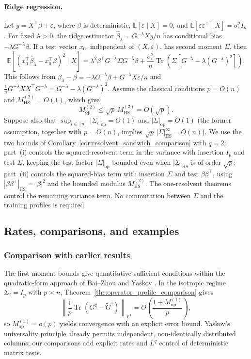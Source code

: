 \documentclass[EJP, preprint, NODS, nobera, nofontexpansion]{ejpecp}
\DeclareMathOperator{\op}{op}
\DeclareMathOperator{\tr}{Tr}
\DeclareMathOperator{\hs}{HS}
\begin{document}
\paragraph{Ridge regression.}
Let $y=X^\top\beta+\varepsilon$, where $\beta$ is deterministic,
$\mathbb E[\varepsilon\mid X]=0$, and
$\mathbb E[\varepsilon\varepsilon^\top\mid X]=\sigma_\varepsilon^2I_n$.
For fixed $\lambda>0$, the ridge estimator
$\hat\beta_{\lambda}=G^{-\lambda}Xy/n$ has conditional bias
$-\lambda G^{-\lambda}\beta$.  If a test vector $x_0$, independent of
$(X,\varepsilon)$, has second moment $\Sigma$, then
\[
\mathbb E\!\left[
    (x_0^\top\hat\beta_{\lambda}-x_0^\top\beta)^2\mid X
  \right]
    =
    \lambda^2\beta^\top G^{-\lambda}\Sigma G^{-\lambda}\beta
    +\frac{\sigma_\varepsilon^2}{n}
       \tr\!\left(\Sigma\left[G^{-\lambda}
                    -\lambda(G^{-\lambda})^2\right]\right).
\]
This follows from
$\hat\beta_{\lambda}-\beta=-\lambda G^{-\lambda}\beta
+G^{-\lambda}X\varepsilon/n$ and
$\frac1n G^{-\lambda}XX^\top G^{-\lambda}=G^{-\lambda}-\lambda(G^{-\lambda})^2$.
Assume the classical conditions $p=O(n)$ and $M_{\hs}^{(2)}=O(1)$, which give
\[
    M_{\op}^{(2)}
    \leq\sqrt p\,M_{\hs}^{(2)}
    =O(\sqrt p).
\]
Suppose also that $\sup_{i\in[n]}|\Sigma_i|_{\op}=O(1)$ and
$|\Sigma|_{\op}=O(1)$ (the former assumption, together with $p=O(n)$,
implies $\sqrt p\,|\Sigma|_{\hs}^{\infty}=O(n)$).
We use the two bounds of
Corollary~\ref{cor:resolvent_sandwich_comparison} with $q=2$:
part~\textnormal{(i)} controls the squared-resolvent term in the variance
with insertion $I_p$ and test $\Sigma$, keeping the test factor
$|\Sigma|_{\op}$ bounded even when $|\Sigma|_{\hs}$ is of order $\sqrt p$;
part~\textnormal{(ii)} controls the squared-bias term with insertion
$\Sigma$ and test $\beta\beta^\top$, using
$|\beta\beta^\top|_{\hs}=|\beta|^2$ and the bounded modulus
$M_{\hs}^{(2)}$.
The one-resolvent theorems control the remaining variance term.  No
commutation between $\Sigma$ and the training profiles is required.

\subsection{Rates, comparisons, and examples}

\subsubsection{Comparison with earlier results}

The first-moment bounds give quantitative sufficient conditions within the
quadratic-form approach of Bai--Zhou \cite{BaiZhou2008} and Yaskov
\cite{Yaskov2016ECP,YaskovUniversality2014}. In the isotropic regime
$\Sigma_i=I_p$ with $p\asymp n$,
Theorem~\ref{the:operator_profile_comparison} gives
\[
    \left\|\frac1p\tr(G^z-\tilde G^z)\right\|_{L^1}
    =O\!\left(\frac{1+M_{\op}^{(1)}}p\right),
\]
so $M_{\op}^{(1)}=o(p)$ yields convergence with an explicit error bound.
Yaskov's universality principle already permits independent,
non-identically distributed columns; our comparisons add explicit rates
and $L^q$ control of deterministic matrix tests.
\end{document}
